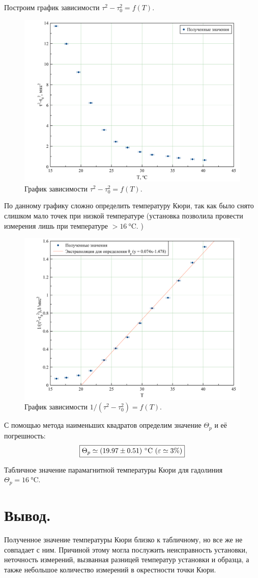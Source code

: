 \documentclass[a4paper, 12pt, twoside]{article}
\begin{document}
Построим график зависимости $\tau^2-\tau_0^2 = f(T)$.
\begin{figure}[H]
	\centering
	\includegraphics[width = 0.8 \textwidth]{1}
	\caption{График зависимости $\tau^2-\tau_0^2 = f(T)$.}
\end{figure}

По данному графику сложно определить температуру Кюри, так как было снято слишком мало точек при низкой температуре (установка позволила провести измерения лишь при температуре $ >16\SI{}{\degreeCelsius}$. )

\begin{figure}[H]
	\centering
	\includegraphics[width = 0.8 \textwidth]{2}
	\caption{График зависимости $1/(\tau^2-\tau_0^2) = f(T)$.}
\end{figure}

С помощью метода наименьших квадратов определим значение $\Theta_p$ и её погрешность:
\begin{equation*}
\fbox{\text{$\Theta_p \simeq (19.97 \pm 0.51) ~ \SI{}{\degreeCelsius}$} ($\varepsilon \simeq 3 \%$)}
\end{equation*}

Табличное значение парамагнитной температуры Кюри для гадолиния $\Theta_p = 16 \SI{}{\degreeCelsius}. $

\section{Вывод.}
Полученное значение температуры Кюри близко к табличному, но все же не совпадает с ним. Причиной этому могла послужить неисправность установки, неточность измерений, вызванная разницей температур установки и образца, а также небольшое количество измерений в окрестности точки Кюри.
\end{document}
